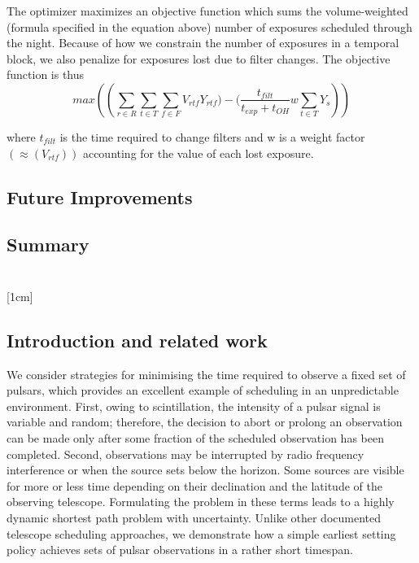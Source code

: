 \documentclass{article}
\begin{document}
The optimizer maximizes an objective function which sums
the volume-weighted (formula specified in the equation above) number of exposures
scheduled through the night. Because of how we constrain the
number of exposures in a temporal block, we also
penalize for exposures lost due to filter changes. The objective
function is thus
\[max\left(\left(\sum_{r \in R}\sum_{t \in T}\sum_{f \in F}V_{rtf}Y_{rtf}) - (\frac{t_{filt}}{t_{exp}+t_{OH}}w\sum_{t \in T}Y_s\right)\right)\]

where \(t_{filt}\) is the time required to change filters and w is a weight
factor \((\approx(V_{rtf}))\) accounting for the value of each lost
exposure.

\subsection*{Future Improvements}

\subsection*{Summary}

\section*{\cite{moser2018dispatch} }

[1cm]

\subsection*{Introduction and related work}

We consider strategies
for minimising the time required to observe a fixed set of pulsars, which provides
an excellent example of scheduling in an unpredictable environment. First, owing to
scintillation, the intensity of a pulsar signal is variable and random; therefore, the
decision to abort or prolong an observation can be made only after some fraction of
the scheduled observation has been completed. Second, observations may be interrupted by 
radio frequency interference or when the source sets below the horizon.
Some sources are visible for more or less time depending on their declination and the
latitude of the observing telescope. Formulating the problem in these terms leads to
a highly dynamic shortest path problem with uncertainty. Unlike other documented
telescope scheduling approaches, we demonstrate how a simple earliest setting policy
achieves sets of pulsar observations in a rather short timespan.
\end{document}
